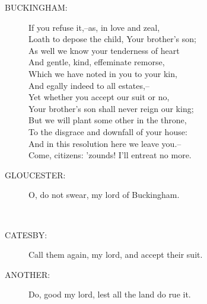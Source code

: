 \documentclass{article}
\begin{document}
\begin{description}
\item[BUCKINGHAM:] 
\hspace{1pt}If you refuse it,--as, in love and zeal,\\
\hspace{1pt}Loath to depose the child, Your brother's son;\\
\hspace{1pt}As well we know your tenderness of heart\\
\hspace{1pt}And gentle, kind, effeminate remorse,\\
\hspace{1pt}Which we have noted in you to your kin,\\
\hspace{1pt}And egally indeed to all estates,--\\
\hspace{1pt}Yet whether you accept our suit or no,\\
\hspace{1pt}Your brother's son shall never reign our king;\\
\hspace{1pt}But we will plant some other in the throne,\\
\hspace{1pt}To the disgrace and downfall of your house:\\
\hspace{1pt}And in this resolution here we leave you.--\\
\hspace{1pt}Come, citizens: 'zounds! I'll entreat no more.\\
\end{description}
\begin{description}
\item[GLOUCESTER:] 
\hspace{1pt}O, do not swear, my lord of Buckingham.\\
\end{description}
\\
\begin{description}
\item[CATESBY:] 
\hspace{1pt}Call them again, my lord, and accept their suit.\\
\end{description}
\begin{description}
\item[ANOTHER:] 
\hspace{1pt}Do, good my lord, lest all the land do rue it.\\
\end{description}
\end{document}

